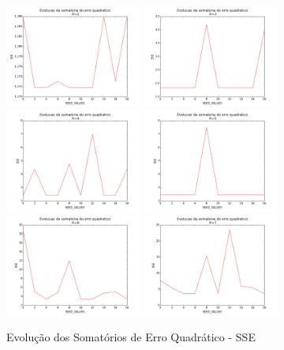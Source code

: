 \documentclass[12pt, a4paper]{article}
\begin{document}
\begin{landscape}
\begin{figure}[!ht]
\label{erros}
  \caption{Evolução dos Somatórios de Erro Quadrático - SSE}
  \centering
    \includegraphics[width=0.4\textwidth]{erro_k2.png}
    \includegraphics[width=0.4\textwidth]{erro_k3.png}
    \includegraphics[width=0.4\textwidth]{erro_k4.png}
    \includegraphics[width=0.4\textwidth]{erro_k5.png}
    \includegraphics[width=0.4\textwidth]{erro_k6.png}
    \includegraphics[width=0.4\textwidth]{erro_k7.png} 

\end{figure}
\end{landscape}
\end{document}
